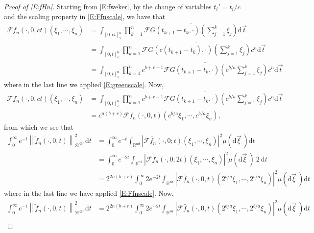 \documentclass[a4paper,11pt]{article}
\numberwithin{equation}{section}
\numberwithin{equation}{section}
\theoremstyle{plain}
\theoremstyle{definition}
\newcommand{\ud}{\ensuremath{\mathrm{d} }}
\newcommand{\Norm}[1]{\left\|  #1   \right\|}
\newcommand{\R}{\mathbb{R}}
\begin{document}
\begin{proof}[Proof of \eqref{E:fHn}]
  Starting from \eqref{E:fweker}, by the change of variables $t_i' = t_i/c$ and the scaling property
  in \eqref{E:Ffnscale}, we have that
  \begin{align*}
    \mathcal{F}f_n(\cdot,0,ct)(\xi_1,\cdots, \xi_n)
    & = \int_{[0,ct]^n_<} \prod_{k=1}^n \overline{ \mathcal{F}G(t_{k+1} - t_k, \cdot)\left( \sum_{j=1}^k \xi_j \right) }  \ud \vec{t}                   \\
    & = \int_{[0,t]^n_<} \prod_{k=1}^n  \overline{ \mathcal{F}G\left(c(t_{k+1} - t_k), \cdot \right)\left( \sum_{j=1}^k \xi_j \right) } c^n \ud \vec{t} \\
    & = \int_{[0,t]^n_<} \prod_{k=1}^n \overline{ c^{b+r-1} \mathcal{F}G\left(t_{k+1} - t_k, \cdot \right)\left( c^{b/a} \sum_{j=1}^k \xi_j \right) } c^n \ud \vec{t}
    \end{align*}
  where in the last line we applied \eqref{E:greenscale}. Now,
  \begin{align*}
    \mathcal{F}f_n(\cdot,0,ct)(\xi_1,\cdots, \xi_n)
    & = \int_{[0,t]^n_<} \prod_{k=1}^n \overline{ c^{b+r-1} \mathcal{F}G\left(t_{k+1} - t_k, \cdot \right)\left( c^{b/a} \sum_{j=1}^k \xi_j \right) } c^n \ud \vec{t} \\
    & = c^{n(b+r)} \mathcal{F}f_n\left(\cdot,0,t\right)\left(c^{b/a}\xi_1, \cdots, c^{b/a}\xi_n\right),
  \end{align*}
  from which we see that
  \begin{align*}
    \int_0^\infty e^{-t} \Norm{ \widetilde{f}_n(\cdot,0,t) }_{\mathcal{H}^{\otimes n}}^2 \ud t
     & = \int_0^\infty e^{-t} \int_{\R^{nd}} \left| \mathcal{F}\widetilde{f_n}(\cdot,0;t)(\xi_1,\cdots,\xi_n) \right|^2 \mu(\ud \vec{\xi}\:)  \ud t         \\
     & = \int_0^\infty e^{-2t} \int_{\R^{nd}} \left| \mathcal{F}\widetilde{f_n}(\cdot,0;2t)(\xi_1,\cdots,\xi_n) \right|^2 \mu(\ud \vec{\xi}\:) \: 2\: \ud t \\
     & = 2^{2n(b+r)}\int_0^\infty 2e^{-2t} \int_{\R^{nd}} \left| \mathcal{F}\widetilde{f_n}(\cdot,0,t)(2^{b/a}\xi_1,\cdots,2^{b/a}\xi_n) \right|^2 \mu(\ud \vec{\xi}\:)   \ud t
  \end{align*}
  where in the last line we have applied \eqref{E:Ffnscale}. Now,
  \begin{align*}
      \int_0^\infty e^{-t} \Norm{ \widetilde{f}_n(\cdot,0,t) }_{\mathcal{H}^{\otimes n}}^2 \ud t
    & = 2^{2n(b+r)}\int_0^\infty 2e^{-2t} \int_{\R^{nd}} \left| \mathcal{F}\widetilde{f_n}(\cdot,0,t)(2^{b/a}\xi_1,\cdots,2^{b/a}\xi_n) \right|^2 \mu(\ud \vec{\xi}\:) \ud t \\

\end{align*}
\end{proof}
\end{document}
